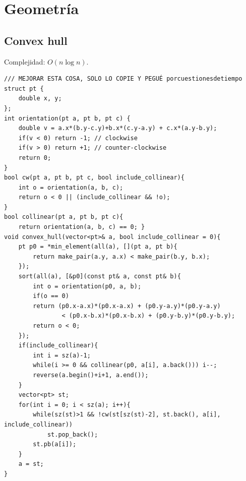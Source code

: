 \section{Geometría}
\subsection{Convex hull}
Complejidad: $O(n\log n)$.
\begin{verbatim}
/// MEJORAR ESTA COSA, SOLO LO COPIE Y PEGUÉ porcuestionesdetiempo
struct pt {
    double x, y;
};
int orientation(pt a, pt b, pt c) {
    double v = a.x*(b.y-c.y)+b.x*(c.y-a.y) + c.x*(a.y-b.y);
    if(v < 0) return -1; // clockwise
    if(v > 0) return +1; // counter-clockwise
    return 0;
}
bool cw(pt a, pt b, pt c, bool include_collinear){
    int o = orientation(a, b, c);
    return o < 0 || (include_collinear && !o);
}
bool collinear(pt a, pt b, pt c){
    return orientation(a, b, c) == 0; }
void convex_hull(vector<pt>& a, bool include_collinear = 0){
    pt p0 = *min_element(all(a), [](pt a, pt b){
        return make_pair(a.y, a.x) < make_pair(b.y, b.x);
    });
    sort(all(a), [&p0](const pt& a, const pt& b){
        int o = orientation(p0, a, b);
        if(o == 0)
        return (p0.x-a.x)*(p0.x-a.x) + (p0.y-a.y)*(p0.y-a.y)
                < (p0.x-b.x)*(p0.x-b.x) + (p0.y-b.y)*(p0.y-b.y);
        return o < 0;
    });
    if(include_collinear){
        int i = sz(a)-1;
        while(i >= 0 && collinear(p0, a[i], a.back())) i--;
        reverse(a.begin()+i+1, a.end());
    }
    vector<pt> st;
    for(int i = 0; i < sz(a); i++){
        while(sz(st)>1 && !cw(st[sz(st)-2], st.back(), a[i], include_collinear))
            st.pop_back();
        st.pb(a[i]);
    }
    a = st;
}
\end{verbatim}